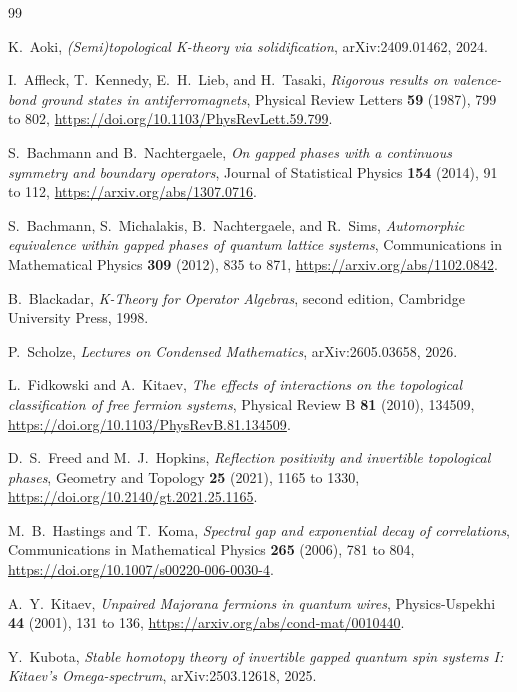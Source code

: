 \documentclass[12pt]{article}
\theoremstyle{definition}
\theoremstyle{remark}
\begin{document}
\begin{thebibliography}{99}

K.~Aoki,
\emph{(Semi)topological K-theory via solidification},
arXiv:2409.01462, 2024.

I.~Affleck, T.~Kennedy, E.~H.~Lieb, and H.~Tasaki,
\emph{Rigorous results on valence-bond ground states in antiferromagnets},
Physical Review Letters \textbf{59} (1987), 799 to 802,
\url{https://doi.org/10.1103/PhysRevLett.59.799}.

S.~Bachmann and B.~Nachtergaele,
\emph{On gapped phases with a continuous symmetry and boundary operators},
Journal of Statistical Physics \textbf{154} (2014), 91 to 112,
\url{https://arxiv.org/abs/1307.0716}.

S.~Bachmann, S.~Michalakis, B.~Nachtergaele, and R.~Sims,
\emph{Automorphic equivalence within gapped phases of quantum lattice systems},
Communications in Mathematical Physics \textbf{309} (2012), 835 to 871,
\url{https://arxiv.org/abs/1102.0842}.

B.~Blackadar,
\emph{K-Theory for Operator Algebras}, second edition,
Cambridge University Press, 1998.

P.~Scholze,
\emph{Lectures on Condensed Mathematics},
arXiv:2605.03658, 2026.

L.~Fidkowski and A.~Kitaev,
\emph{The effects of interactions on the topological classification of free
fermion systems},
Physical Review B \textbf{81} (2010), 134509,
\url{https://doi.org/10.1103/PhysRevB.81.134509}.

D.~S.~Freed and M.~J.~Hopkins,
\emph{Reflection positivity and invertible topological phases},
Geometry and Topology \textbf{25} (2021), 1165 to 1330,
\url{https://doi.org/10.2140/gt.2021.25.1165}.

M.~B.~Hastings and T.~Koma,
\emph{Spectral gap and exponential decay of correlations},
Communications in Mathematical Physics \textbf{265} (2006), 781 to 804,
\url{https://doi.org/10.1007/s00220-006-0030-4}.

A.~Y.~Kitaev,
\emph{Unpaired Majorana fermions in quantum wires},
Physics-Uspekhi \textbf{44} (2001), 131 to 136,
\url{https://arxiv.org/abs/cond-mat/0010440}.

Y.~Kubota,
\emph{Stable homotopy theory of invertible gapped quantum spin systems I:
Kitaev's Omega-spectrum},
arXiv:2503.12618, 2025.


\end{thebibliography}
\end{document}
